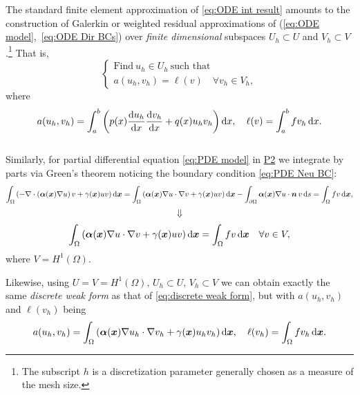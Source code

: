 	The standard finite element approximation of \eqref{eq:ODE int result} 
	amounts to the construction of Galerkin or weighted residual 
	approximations of (\ref{eq:ODE model},~\ref{eq:ODE Dir BCs}) over 
	\emph{finite dimensional} subspaces $U_h \subset U$ and 
	$V_h \subset V$.\footnote{The subscript $h$ is a discretization parameter 
	generally chosen as a measure of the mesh size.} That is, 
	\begin{equation}\label{eq:discrete weak form}
	\begin{cases}
	\textrm{Find}\ u_h\in U_h \ \textrm{such that}\\
	a(u_h,v_h)=\ell(v) \quad \forall v_h\in V_h,
	\end{cases}
	\end{equation}
	where 
	\begin{equation}\label{eq:discrete ODE formulas}
	a(u_h,v_h)=\int_a^b\left(p(x)\frac{\mathrm{d} u_h}{\mathrm{d} x}\frac{\mathrm{d} v_h}{\mathrm{d} x}
		+q(x)u_hv_h\right)\mathrm{d} x,
	\quad \ell(v)=\int_a^b fv_h\,\mathrm{d} x.
	\end{equation}\\
	
	Similarly, for partial differential equation \eqref{eq:PDE model} in 
	\hyperlink{P2}{P2} we integrate by parts via Green's theorem 
	noticing the boundary condition \eqref{eq:PDE Neu BC}:
	\begin{equation*}
	\int_{\Omega}\left(-\nabla\cdot(\bm{\alpha}(\bm{x})\nabla u)\,v
		+\gamma(\bm{x})uv\right) \mathrm{d}\bm{x} =	
	\int_{\Omega}\left(\bm{\alpha}(\bm{x}) \nabla u \cdot \nabla v
		+\gamma(\bm{x})uv\right) \mathrm{d}\bm{x} -
	\int_{\partial\Omega}\bm{\alpha}(\bm{x})\nabla u\cdot\bm{n}\,v\,\mathrm{d} s 
	=\int_{\Omega}fv\,\mathrm{d}\bm{x},
	\end{equation*}
	$$\Downarrow$$
	\begin{equation}\label{eq:PDE int result}
	\int_{\Omega}\left(\bm{\alpha}(\bm{x})\nabla u\cdot\nabla v
		+\gamma(\bm{x})uv\right) \mathrm{d}\bm{x} = \int_{\Omega}fv\,\mathrm{d}\bm{x}\quad\forall v\in V,
	\end{equation}
	where $V=H^1(\Omega)$.
	
	Likewise, using $U=V=H^1(\Omega),\,U_h \subset U,\,V_h \subset V$
	we can obtain exactly the same \emph{discrete weak form} as that of
	\eqref{eq:discrete weak form}, but with $a(u_h,v_h)$ and $\ell(v_h)$
	being
	\begin{equation}\label{eq:discrete PDE formulas}
	a(u_h,v_h)=\int_{\Omega}\left(\bm{\alpha}(\bm{x})\nabla u_h\cdot\nabla v_h 
		+\gamma(\bm{x})u_hv_h\right) \mathrm{d}\bm{x},\quad\ell(v_h)=\int_{\Omega}fv_h\,\mathrm{d}\bm{x}.
	\end{equation}
	
